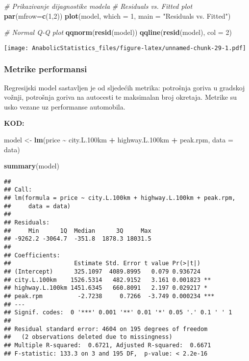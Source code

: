 \documentclass[
]{article}
\newenvironment{Shaded}{\begin{snugshade}}{\end{snugshade}}
\newcommand{\AttributeTok}[1]{\textcolor[rgb]{0.13,0.29,0.53}{#1}}
\newcommand{\CommentTok}[1]{\textcolor[rgb]{0.56,0.35,0.01}{\textit{#1}}}
\newcommand{\DecValTok}[1]{\textcolor[rgb]{0.00,0.00,0.81}{#1}}
\newcommand{\FloatTok}[1]{\textcolor[rgb]{0.00,0.00,0.81}{#1}}
\newcommand{\FunctionTok}[1]{\textcolor[rgb]{0.13,0.29,0.53}{\textbf{#1}}}
\newcommand{\NormalTok}[1]{#1}
\newcommand{\OtherTok}[1]{\textcolor[rgb]{0.56,0.35,0.01}{#1}}
\newcommand{\SpecialCharTok}[1]{\textcolor[rgb]{0.81,0.36,0.00}{\textbf{#1}}}
\newcommand{\StringTok}[1]{\textcolor[rgb]{0.31,0.60,0.02}{#1}}
\begin{document}
\begin{Shaded}
\begin{Highlighting}[]
\CommentTok{\# Prikazivanje dijagnostike modela}
\CommentTok{\# Residuals vs. Fitted plot}
\FunctionTok{par}\NormalTok{(}\AttributeTok{mfrow=}\FunctionTok{c}\NormalTok{(}\DecValTok{1}\NormalTok{,}\DecValTok{2}\NormalTok{))}
\FunctionTok{plot}\NormalTok{(model, }\AttributeTok{which =} \DecValTok{1}\NormalTok{, }\AttributeTok{main =} \StringTok{"Residuals vs. Fitted"}\NormalTok{)}

\CommentTok{\# Normal Q{-}Q plot}
\FunctionTok{qqnorm}\NormalTok{(}\FunctionTok{resid}\NormalTok{(model))}
\FunctionTok{qqline}\NormalTok{(}\FunctionTok{resid}\NormalTok{(model), }\AttributeTok{col =} \DecValTok{2}\NormalTok{)}
\end{Highlighting}
\end{Shaded}

\texttt{[image: AnabolicStatistics\_files/figure-latex/unnamed-chunk-29-1.pdf]}

\subsubsection{Metrike performansi}\label{metrike-performansi}

Regresijski model sastavljen je od sljedećih metrika: potrošnja goriva u
gradskoj vožnji, potrošnja goriva na autocesti te maksimalan broj
okretaja. Metrike su usko vezane uz performanse automobila.

\textbf{KOD:}

\begin{Shaded}
\begin{Highlighting}[]
\NormalTok{model }\OtherTok{\textless{}{-}} \FunctionTok{lm}\NormalTok{(price }\SpecialCharTok{\textasciitilde{}}\NormalTok{ city.L}\FloatTok{.100}\NormalTok{km }\SpecialCharTok{+}\NormalTok{ highway.L}\FloatTok{.100}\NormalTok{km }\SpecialCharTok{+}\NormalTok{ peak.rpm, }\AttributeTok{data =}\NormalTok{ data)}

\FunctionTok{summary}\NormalTok{(model)}
\end{Highlighting}
\end{Shaded}

\begin{verbatim}
## 
## Call:
## lm(formula = price ~ city.L.100km + highway.L.100km + peak.rpm, 
##     data = data)
## 
## Residuals:
##     Min      1Q  Median      3Q     Max 
## -9262.2 -3064.7  -351.8  1878.3 18031.5 
## 
## Coefficients:
##                  Estimate Std. Error t value Pr(>|t|)    
## (Intercept)      325.1097  4089.8995   0.079 0.936724    
## city.L.100km    1526.5314   482.9152   3.161 0.001823 ** 
## highway.L.100km 1451.6345   660.8091   2.197 0.029217 *  
## peak.rpm          -2.7238     0.7266  -3.749 0.000234 ***
## ---
## Signif. codes:  0 '***' 0.001 '**' 0.01 '*' 0.05 '.' 0.1 ' ' 1
## 
## Residual standard error: 4604 on 195 degrees of freedom
##   (2 observations deleted due to missingness)
## Multiple R-squared:  0.6721, Adjusted R-squared:  0.6671 
## F-statistic: 133.3 on 3 and 195 DF,  p-value: < 2.2e-16
\end{verbatim}
\end{document}
